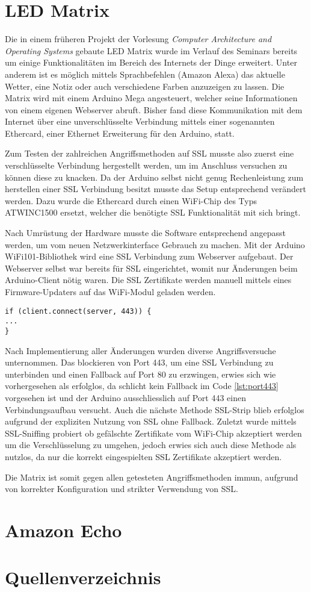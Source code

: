 \documentclass[11pt,a4paper]{scrartcl}
\begin{document}
\section{LED Matrix}
Die in einem früheren Projekt der Vorlesung \textit{Computer Architecture and Operating Systems} gebaute LED Matrix wurde im Verlauf des Seminars bereits um einige Funktionalitäten im Bereich des Internets der Dinge erweitert. Unter anderem ist es möglich mittels Sprachbefehlen (Amazon Alexa) das aktuelle Wetter, eine Notiz oder auch verschiedene Farben anzuzeigen zu lassen. Die Matrix wird mit einem Arduino Mega angesteuert, welcher seine Informationen von einem eigenen Webserver abruft. Bisher fand diese Kommunikation mit dem Internet über eine unverschlüsselte Verbindung mittels einer sogenannten Ethercard, einer Ethernet Erweiterung für den Arduino, statt.

Zum Testen der zahlreichen Angriffsmethoden auf SSL musste also zuerst eine verschlüsselte Verbindung hergestellt werden, um im Anschluss versuchen zu können diese zu knacken. Da der Arduino selbst nicht genug Rechenleistung zum herstellen einer SSL Verbindung besitzt musste das Setup entsprechend verändert werden. Dazu wurde die Ethercard durch einen WiFi-Chip des Typs ATWINC1500 ersetzt, welcher die benötigte SSL Funktionalität mit sich bringt. 

Nach Umrüstung der Hardware musste die Software entsprechend angepasst werden, um vom neuen Netzwerkinterface Gebrauch zu machen. Mit der Arduino WiFi101-Bibliothek \cite{arduino:WiFi} wird eine SSL Verbindung zum Webserver aufgebaut. Der Webserver selbst war bereits für SSL eingerichtet, womit nur Änderungen beim Arduino-Client nötig waren. Die SSL Zertifikate werden manuell mittels eines Firmware-Updaters auf das WiFi-Modul geladen werden.
\begin{lstlisting}[label={lst:port443},caption={Port 443 ohne Fallback auf Port 80}]
if (client.connect(server, 443)) {
...
}
\end{lstlisting}
Nach Implementierung aller Änderungen wurden diverse Angriffsversuche unternommen. Das blockieren von Port 443, um eine SSL Verbindung zu unterbinden und einen Fallback auf Port 80 zu erzwingen, erwies sich wie vorhergesehen als erfolglos, da schlicht kein Fallback im Code \ref{lst:port443} vorgesehen ist und der Arduino ausschliesslich auf Port 443 einen Verbindungsaufbau versucht.
Auch die nächste Methode SSL-Strip blieb erfolglos aufgrund der expliziten Nutzung von SSL ohne Fallback.
Zuletzt wurde mittels SSL-Sniffing probiert ob gefälschte Zertifikate vom WiFi-Chip akzeptiert werden um die Verschlüsselung zu umgehen, jedoch erwies sich auch diese Methode als nutzlos, da nur die korrekt eingespielten SSL Zertifikate akzeptiert werden. 

Die Matrix ist somit gegen allen getesteten Angriffsmethoden immun, aufgrund von korrekter Konfiguration und strikter Verwendung von SSL. 

\section{Amazon Echo}

\section{Quellenverzeichnis}
\printbibliography[heading=none]
\end{document}
